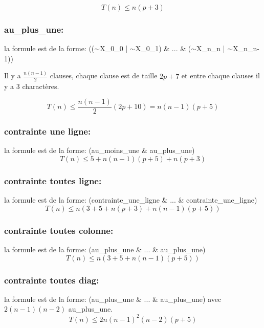     \begin{equation*}
        T(n) \le n(p+3)
    \end{equation*}
    \subsubsection*{au\_plus\_une:}
    la formule est de la forme: (($\sim$X\_0\_0 | $\sim$X\_0\_1) \& ... \& ($\sim$X\_n\_n | $\sim$X\_n\_n-1))

    Il y a $\frac{n(n-1)}{2}$ clauses, chaque clause est de taille $2p + 7$ et entre chaque clauses il y a $3$ charactères.

    \begin{equation*}
        T(n) \le \frac{n(n-1)}{2}(2p + 10) = n(n-1)(p+5) 
    \end{equation*}
    \subsubsection*{contrainte une ligne:}
    la formule est de la forme: (au\_moins\_une \& au\_plus\_une)
    \begin{equation*}
       T(n) \le 5 + n(n-1)(p+5) + n(p+3) 
    \end{equation*}
    \subsubsection*{contrainte toutes ligne:}
    la formule est de la forme: (contrainte\_une\_ligne \& ... \& contrainte\_une\_ligne) 
    \begin{equation*}
       T(n) \le n(3 + 5 + n(p+3) + n(n-1)(p+5)) 
    \end{equation*}
    \subsubsection*{contrainte toutes colonne:}
    la formule est de la forme: (au\_plus\_une \& ... \& au\_plus\_une) 
    \begin{equation*}
       T(n) \le n(3 + 5 + n(n-1)(p+5)) 
    \end{equation*}
    \subsubsection*{contrainte toutes diag:}
    la formule est de la forme: (au\_plus\_une \& ... \& au\_plus\_une) 
    avec $2(n-1)(n-2)$ au\_plus\_une.
    \begin{equation*}
        T(n) \le 2n(n-1)^2(n-2)(p+5) 
     \end{equation*} 
